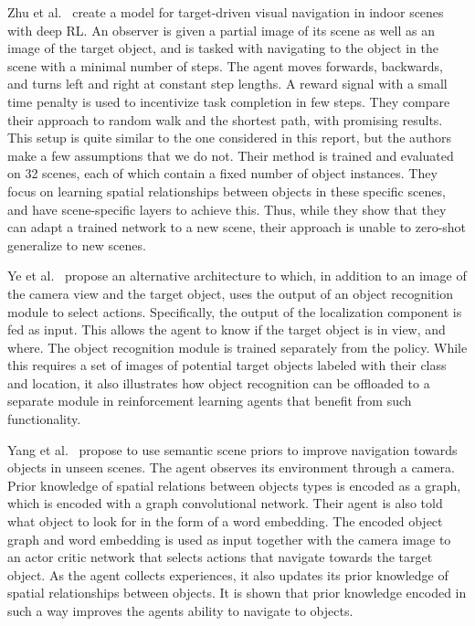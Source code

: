 Zhu et al.~\cite{zhu_target-driven_2017} create a model for target-driven visual navigation in indoor scenes with deep RL.
An observer is given a partial image of its scene as well as an image of the target object, and is tasked with navigating to the object in the scene with a minimal number of steps.
The agent moves forwards, backwards, and turns left and right at constant step lengths.
A reward signal with a small time penalty is used to incentivize task completion in few steps.
They compare their approach to random walk and the shortest path, with promising results.
This setup is quite similar to the one considered in this report, but the authors make a few assumptions that we do not.
Their method is trained and evaluated on 32 scenes, each of which contain a fixed number of object instances.
They focus on learning spatial relationships between objects in these specific scenes, and have scene-specific layers to achieve this.
Thus, while they show that they can adapt a trained network to a new scene, their approach is unable to zero-shot generalize to new scenes.

Ye et al.~\cite{ye_active_2018} propose an alternative architecture to \cite{zhu_target-driven_2017} which, in addition to an image of the camera view and the target object, uses the output of an object recognition module to select actions.
Specifically, the output of the localization component is fed as input.
This allows the agent to know if the target object is in view, and where.
The object recognition module is trained separately from the policy.
While this requires a set of images of potential target objects labeled with their class and location, it also illustrates how object recognition can be offloaded to a separate module in reinforcement learning agents that benefit from such functionality.

Yang et al.~\cite{yang_visual_2018} propose to use semantic scene priors to improve navigation towards objects in unseen scenes.
The agent observes its environment through a camera.
Prior knowledge of spatial relations between objects types is encoded as a graph, which is encoded with a graph convolutional network.
Their agent is also told what object to look for in the form of a word embedding.
The encoded object graph and word embedding is used as input together with the camera image to an actor critic network that selects actions that navigate towards the target object.
As the agent collects experiences, it also updates its prior knowledge of spatial relationships between objects.
It is shown that prior knowledge encoded in such a way improves the agents ability to navigate to objects.

